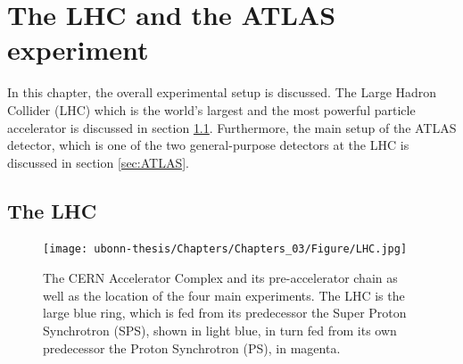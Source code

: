 
\chapter{The LHC and the ATLAS experiment}
\label{chap:lhcandatlas}

In this chapter, the overall experimental setup is discussed. The Large Hadron Collider (LHC) which is the world's largest and the most powerful particle accelerator is discussed in section \ref{sec:largehadroncollider}. Furthermore, the main setup of the ATLAS detector, which is one of the two general-purpose detectors at the LHC is discussed in section \ref{sec:ATLAS}.

\section{The LHC}
\label{sec:largehadroncollider}

\begin{figure}[!h]
\centering
\texttt{[image: ubonn-thesis/Chapters/Chapters\_03/Figure/LHC.jpg]}
\caption{The CERN Accelerator Complex and its pre-accelerator chain as well as the location of the four main experiments\cite{Haffner:1621894}. The LHC is the large blue ring, which is fed from its predecessor the Super Proton Synchrotron (SPS), shown in light blue, in turn fed from its own predecessor the Proton Synchrotron (PS), in magenta. }
%
\label{fig:LHC}
\end{figure}

